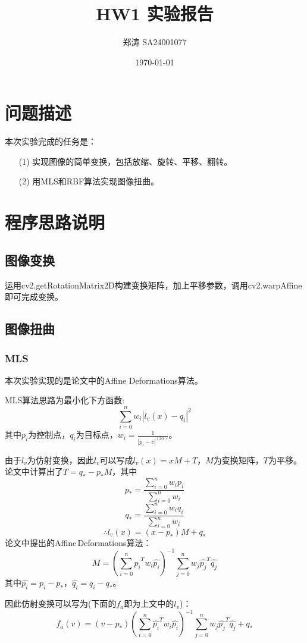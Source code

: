 \documentclass{article}
\title{HW1 实验报告}
\author{郑涛 SA24001077}
\date{\today}
\begin{document}
	\maketitle
	\section{问题描述}
	本次实验完成的任务是：
	\begin{enumerate}
		\item [(1)] 实现图像的简单变换，包括放缩、旋转、平移、翻转。
		\item [(2)] 用MLS和RBF算法实现图像扭曲。
	\end{enumerate}
	\section{程序思路说明}
	\subsection{图像变换}
	运用cv2.getRotationMatrix2D构建变换矩阵，加上平移参数，调用cv2.warpAffine即可完成变换。
	\subsection{图像扭曲}
	\subsubsection{MLS}
	本次实验实现的是论文\cite{MLS}中的Affine Deformations算法。
	
	MLS算法思路为最小化下方函数:
	\begin{equation}
		\sum_{i=0}^{n}w_i|l_v(x)-q_i|^2
	\end{equation}
	其中$p_i$为控制点，$q_i$为目标点，$w_i=\frac{1}{|p_i-v|^(2\alpha)}$。
	
	由于$l_v$为仿射变换，因此$l_v$可以写成$l_v(x)=xM+T$，$M$为变换矩阵，$T$为平移。论文中计算出了$T=q_*-p_*M$，其中
	$$p_*=\frac{\sum_{i=0}^{n}w_ip_i}{\sum_{i=0}^{n}w_i}$$
	$$q_*=\frac{\sum_{i=0}^{n}w_iq_i}{\sum_{i=0}^{n}w_i}$$
	$$\therefore l_v(x)=(x-p_*)M+q_*$$
	论文中提出的Affine\,Deformations算法：
	\begin{equation}
		M=(\sum_{i=0}^{n}\hat{p_i}^Tw_i\hat{p_i})^{-1}\sum_{j=0}^{n}w_j\hat{p_j}^T\hat{q_j}
	\end{equation}
	其中$\hat{p_i}=p_i-p_*$，$\hat{q_i}=q_i-q_*$。
	
	因此仿射变换可以写为(下面的$f_a$即为上文中的$l_v$)：
	\begin{equation}
		f_a(v)=(v-p_*)(\sum_{i=0}^{n}\hat{p_i}^Tw_i\hat{p_i})^{-1}\sum_{j=0}^{n}w_j\hat{p_j}^T\hat{q_j}+q_*
	\end{equation}
	
\end{document}
